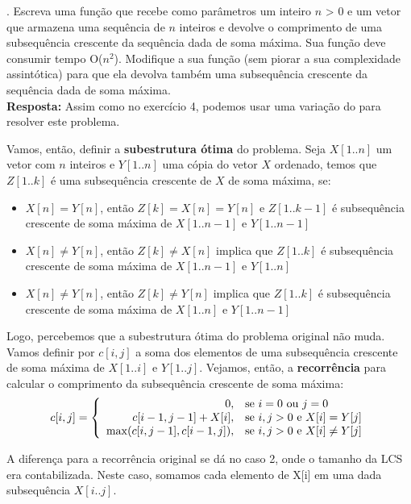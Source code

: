 
. Escreva uma função que recebe como parâmetros um inteiro $n$ > 0 e um vetor que armazena uma sequência de $n$ inteiros e devolve o comprimento de uma subsequência crescente da sequência dada de soma máxima. Sua função deve consumir tempo O($n^2$). Modifique a sua função (sem piorar a sua complexidade assintótica) para que ela devolva também uma subsequência crescente da sequência dada de soma máxima.\\[6pt]

\textbf{Resposta:} Assim como no exercício 4, podemos usar uma variação do  para resolver este problema.

Vamos, então, definir a \textbf{subestrutura ótima} do problema. Seja $X[1..n]$ um vetor com $n$ inteiros e $Y[1..n]$ uma cópia do vetor $X$ ordenado, temos que $Z[1..k]$ é uma subsequência crescente de $X$ de soma máxima, se:

\begin{itemize}
  \item $X[n] = Y[n]$, então $Z[k] = X[n] = Y[n]$ e $Z[1..k-1]$ é subsequência crescente de soma máxima de $X[1..n-1]$ e $Y[1..n-1]$
  \item $X[n] \neq Y[n]$, então $Z[k] \neq X[n]$ implica que $Z[1..k]$ é subsequência crescente de soma máxima de $X[1..n-1]$ e $Y[1..n]$
  \item $X[n] \neq Y[n]$, então $Z[k] \neq Y[n]$ implica que $Z[1..k]$ é subsequência crescente de soma máxima de $X[1..n]$ e $Y[1..n-1]$
\end{itemize}

Logo, percebemos que a subestrutura ótima do problema original não muda. Vamos definir por $c[i, j]$ a soma dos elementos de uma subsequência crescente de soma máxima de $X[1..i]$ e $Y[1..j]$. Vejamos, então, a \textbf{recorrência} para calcular o comprimento da subsequência crescente de soma máxima:
\begin{align*}
c[i, j] = \left\{\begin{array}{rl}
                    0, &\mbox{se $i = 0$ ou $j = 0$} \\
                    c[i-1, j-1] + X[i], &\mbox{se $i, j > 0$ e $X[i] = Y[j]$} \\
                    \smash{\displaystyle\max (c[i, j-1], c[i-1, j])}, &\mbox{se $i, j > 0$ e $X[i] \neq Y[j]$}
                \end{array} \right.
\end{align*}

A diferença para a recorrência original se dá no caso 2, onde o tamanho da LCS era contabilizada. Neste caso, somamos cada elemento de X[i] em uma dada subsequência $X[i..j]$.

